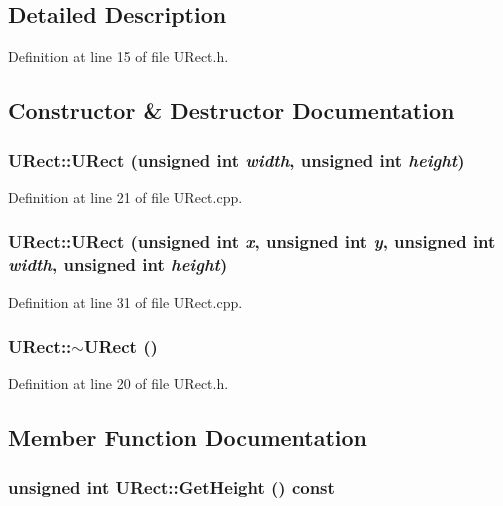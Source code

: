 \subsection{Detailed Description}


Definition at line 15 of file URect.h.

\subsection{Constructor \& Destructor Documentation}
\hypertarget{class_u_rect_8f6475f6ae283b8ce64c0d90dbdf3f4f}{
\subsubsection[{URect}]{\setlength{\rightskip}{0pt plus 5cm}URect::URect (unsigned int {\em width}, \/  unsigned int {\em height})}}
\label{class_u_rect_8f6475f6ae283b8ce64c0d90dbdf3f4f}




Definition at line 21 of file URect.cpp.\hypertarget{class_u_rect_5eb595be310fb38697065af3c76bfbfd}{
\subsubsection[{URect}]{\setlength{\rightskip}{0pt plus 5cm}URect::URect (unsigned int {\em x}, \/  unsigned int {\em y}, \/  unsigned int {\em width}, \/  unsigned int {\em height})}}
\label{class_u_rect_5eb595be310fb38697065af3c76bfbfd}




Definition at line 31 of file URect.cpp.\hypertarget{class_u_rect_752806b5a4e2dd3d43225837e85b0ae6}{
\subsubsection[{$\sim$URect}]{\setlength{\rightskip}{0pt plus 5cm}URect::$\sim$URect ()}}
\label{class_u_rect_752806b5a4e2dd3d43225837e85b0ae6}




Definition at line 20 of file URect.h.

\subsection{Member Function Documentation}
\hypertarget{class_u_rect_d26d5973be04cc49595281086ac71af9}{
\subsubsection[{GetHeight}]{\setlength{\rightskip}{0pt plus 5cm}unsigned int URect::GetHeight () const}}
\label{class_u_rect_d26d5973be04cc49595281086ac71af9}




